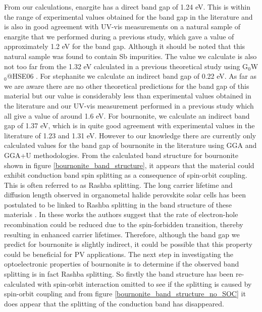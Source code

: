 From our calculations, enargite has a direct band gap of 1.24 eV. This is within the range of experimental values obtained for the band gap in the literature and is also in good agreement with UV-vis measurements on a natural sample of enargite that we performed during a previous study, which gave a value of approximately 1.2 eV for the band gap. Although it should be noted that this natural sample was found to contain Sb impurities. The value we calculate is also not too far from the 1.32 eV calculated in a previous theoretical study using G$_0$W$_0$@HSE06 \cite{Zunger}.
For stephanite we calculate an indirect band gap of 0.22 eV. As far as we are aware there are no other theoretical predictions for the band gap of this material but our value is considerably less than experimental values obtained in the literature \cite{Dittrich1}  and our UV-vis measurement performed in a previous study which all give a value of around 1.6 eV.
For bournonite, we calculate an indirect band gap of 1.37 eV, which is in quite good agreement with experimental values in the literature of 1.23 \cite{Dittrich1} and 1.31 \cite{bournonite} eV. However to our knowledge there are currently only calculated values for the band gap of bournonite in the literature using GGA and GGA+U methodologies. From the calculated band structure for bournonite shown in figure \ref{bournonite_band_structure}, it appears that the material could exhibit conduction band spin splitting as a consequence of spin-orbit coupling. This is often referred to as Rashba splitting. The long carrier lifetime and diffusion length observed in organometal halide perovskite solar cells has been postulated to be linked to Rashba splitting in the band structure of these materials \cite{Rashba_MAPI, Rashba_MAPI_aron}. In these works the authors suggest that the rate of electron-hole recombination could be reduced due to the spin-forbidden transition, thereby resulting in enhanced carrier lifetimes. 
Therefore, although the band gap we predict for bournonite is slightly indirect, it could be possible that this property could be beneficial for PV applications. The next step in investigating the optoelectronic properties of bournonite is to determine if the observed band splitting is in fact Rashba splitting. So firstly the band structure has been re-calculated with spin-orbit interaction omitted to see if the splitting is caused by spin-orbit coupling and from figure \ref{bournonite_band_structure_no_SOC} it does appear that the splitting of the conduction band has disappeared.

